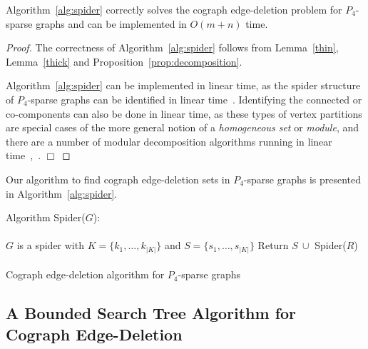 \documentclass{llncs}
\begin{document}
\begin{theorem}
 Algorithm~\ref{alg:spider} correctly solves the cograph edge-deletion problem for $P_4$-sparse graphs and can be implemented in $O(m+n)$ time.
\end{theorem}

\begin{proof}
 The correctness of Algorithm~\ref{alg:spider} follows from Lemma~\ref{thin}, Lemma~\ref{thick} and Proposition~\ref{prop:decomposition}.

 Algorithm~\ref{alg:spider} can be implemented in linear time, as the spider structure of $P_4$-sparse graphs can be identified in linear time~\cite{JaOl}. Identifying the connected or co-components can also be done in linear time, as these types of vertex partitions are special cases of the more general notion of a \emph{homogeneous set} or \emph{module}, and there are a number of modular decomposition algorithms running in linear time~\cite{McCSp},~\cite{CoHa}.
\hfill $\Box$
\end{proof}

Our algorithm to find cograph edge-deletion sets in $P_4$-sparse graphs is presented in Algorithm~\ref{alg:spider}.

\begin{algorithm}[H]
\SetAlgoLined Algorithm {\sc Spider($G$)}:\\
\ \\
$G$ is a spider with $K = \{k_1, \ldots , k_{|K|}\}$ and $S = \{s_1,\ldots ,s_{|K|}\}$\;
Return $S \ \cup $ {\sc Spider($R$)}\;
\ \\
\caption{Cograph edge-deletion algorithm for $P_4$-sparse graphs}
\label{alg:spider}
\end{algorithm}

\subsection{A Bounded Search Tree Algorithm for Cograph Edge-Deletion}
\end{document}

